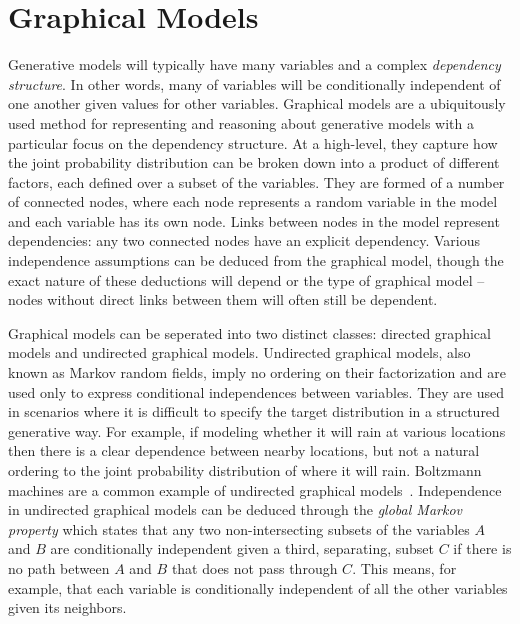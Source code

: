 
\section{Graphical Models}
\label{sec:bayes:paradigm:graph}

Generative models will typically have many variables and a complex \emph{dependency structure}.
In other words, many of variables will be conditionally independent of one another given values for
other variables.  Graphical models are a ubiquitously used method for representing and reasoning
about generative models with a particular focus on the dependency structure.  At a high-level, they
capture how the joint probability distribution can be broken down into a product of different factors, 
each defined over
a subset of the variables.  They are formed of a number of connected nodes, where each node
represents a random variable in the model and each variable has its own node.  Links between nodes in
the model represent dependencies: any two connected nodes have an explicit dependency.
Various independence assumptions can be deduced from the graphical model, though the exact nature
of these deductions will depend or the type of graphical model -- nodes without direct links
between them will often still be dependent.

Graphical models can be seperated into two distinct classes: directed graphical
models and undirected graphical models.  Undirected graphical models, also known as Markov random
fields, imply no ordering on their factorization and are used only to express conditional independences
between variables.  They are used in scenarios where it is difficult to specify the target distribution in a
structured generative way.  For example, if modeling whether it will rain at various locations then there
is a clear dependence between nearby locations, but not a natural ordering to the joint probability
distribution of where it will rain.  Boltzmann machines are a common example of undirected graphical
models~\citep{ackley1985learning}.  Independence in undirected graphical models can be deduced
through the \emph{global Markov property} which states that any two non-intersecting subsets of the 
variables $A$ and $B$ are
conditionally independent given a third, separating, subset $C$ if there is no path between $A$ and
$B$ that does not pass through $C$.  This means, for example, that each variable is conditionally
independent of all the other variables given its neighbors.

